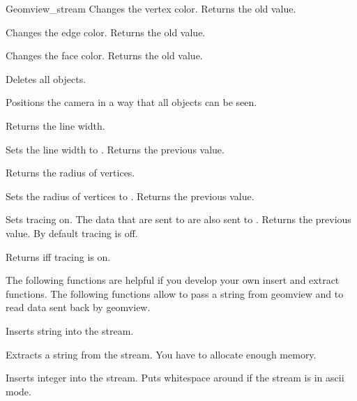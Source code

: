 \begin{ccClass}{Geomview_stream}
{Changes the vertex color. Returns the old value.}

{Changes the edge color. Returns the old value.}


{Changes the face color. Returns the old value.}



{Deletes all objects.}

{Positions the camera in a way that all objects can be seen.}

{Returns the line width.}

{Sets the line width to . Returns the previous value.}

{Returns the radius of vertices.}

{Sets the radius of vertices to . Returns the previous value.}

{Sets tracing on. The data that are sent to  are also
 sent to .  Returns the previous value. By default tracing is
 off.}

{Returns  iff tracing is on.}


\begin{ccAdvanced}


The following functions are helpful if you develop your own insert
and extract functions. The following functions allow to pass a string
from geomview and to read data sent back by geomview.

{Inserts string  into the stream.}


{Extracts a string  from the stream.
\ccPrecond You have to allocate enough memory.}

{Inserts integer  into the stream. Puts whitespace around if the
stream is in ascii mode.}



\end{ccAdvanced}
\end{ccClass}
